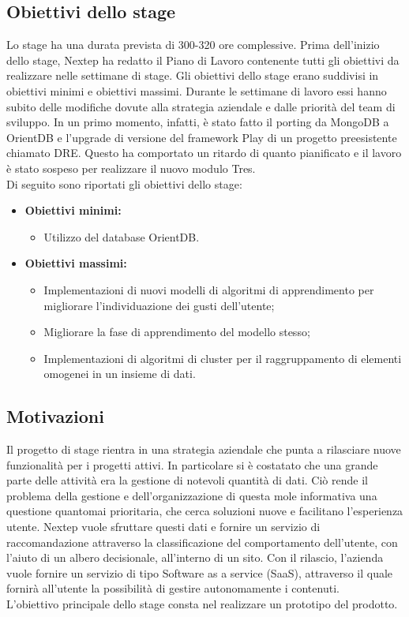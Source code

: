 \newpage
\subsection{Obiettivi dello stage}
Lo stage ha una durata prevista di 300-320 ore complessive. Prima dell'inizio dello stage, Nextep ha redatto il Piano di Lavoro contenente tutti gli obiettivi da realizzare nelle settimane di stage.
Gli obiettivi dello stage erano suddivisi in obiettivi minimi e obiettivi massimi. Durante le settimane  di lavoro essi hanno subito delle modifiche dovute alla strategia aziendale e dalle priorità del team di sviluppo. In un primo momento, infatti, è stato fatto il porting da MongoDB a OrientDB e l'upgrade di versione del \gls{framework} Play di un progetto preesistente chiamato DRE. Questo ha comportato un ritardo di quanto pianificato e il lavoro è stato sospeso per realizzare il nuovo modulo Tres.\\
Di seguito sono riportati gli obiettivi dello stage:
\begin{itemize}
	\item \textbf{Obiettivi minimi:}
	\begin{itemize}
		\item Utilizzo del database OrientDB.
	\end{itemize}
	\item \textbf{Obiettivi massimi:}
	\begin{itemize}
		\item Implementazioni di nuovi modelli di algoritmi di apprendimento per migliorare l'individuazione dei gusti dell'utente;
		\item Migliorare la fase di apprendimento del modello stesso;
		\item Implementazioni di algoritmi di cluster per il raggruppamento di elementi omogenei in un insieme di dati.
	\end{itemize}
\end{itemize}

\subsection{Motivazioni}
Il progetto di stage rientra in una strategia aziendale che punta a rilasciare nuove funzionalità per i progetti attivi. In particolare si è costatato che una grande parte delle attività era la gestione di notevoli quantità di dati. Ciò rende il problema della gestione e dell'organizzazione di questa mole informativa una questione quantomai prioritaria, che cerca soluzioni nuove e facilitano l'esperienza utente. Nextep vuole sfruttare questi dati e fornire un servizio di raccomandazione attraverso la classificazione del comportamento dell'utente, con l'aiuto di un albero decisionale, all'interno di un sito. Con il rilascio, l'azienda vuole fornire un servizio di tipo Software as a service (SaaS), attraverso il quale fornirà all'utente la possibilità di gestire autonomamente i contenuti.\\
L'obiettivo principale dello stage consta nel realizzare un prototipo del prodotto.


